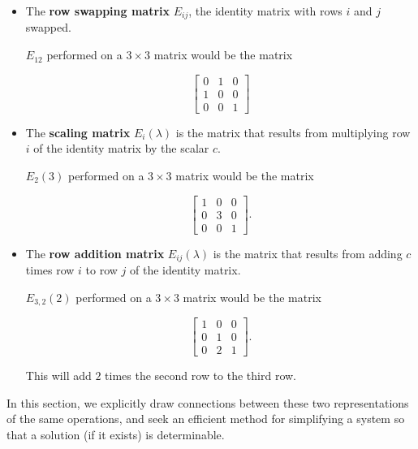\documentclass{ximera}
\begin{document}
\begin{itemize}

  \item The \textbf{row swapping matrix} $E_{ij}$, the identity matrix with rows $i$ and $j$ swapped.
  
  $E_{12}$ performed on a $3\times 3$ matrix would be the matrix

  \begin{equation*}
    \begin{bmatrix}
      0 & 1 & 0 \\
      1 & 0 & 0 \\
      0 & 0 & 1
    \end{bmatrix}
  \end{equation*}

  \item The \textbf{scaling matrix} $E_{i}(\lambda)$ is the matrix that results from multiplying row $i$ of the identity matrix by the scalar $c$.
  
  $E_{2}(3)$ performed on a $3\times 3$ matrix would be the matrix

  \begin{equation*}
    \begin{bmatrix}
      1 & 0 & 0 \\
      0 & 3 & 0 \\
      0 & 0 & 1
    \end{bmatrix}.
  \end{equation*}

  \item The \textbf{row addition matrix} $E_{ij}(\lambda)$ is the matrix that results from adding $c$ times row $i$ to row $j$ of the identity matrix.
  
  $E_{3,2}(2)$ performed on a $3\times 3$ matrix would be the matrix

  \begin{equation*}
    \begin{bmatrix}
      1 & 0 & 0 \\
      0 & 1 & 0 \\
      0 & 2 & 1
    \end{bmatrix}.
  \end{equation*}

  This will add $2$ times the second row to the third row.

\end{itemize}
 
In this section, we explicitly draw connections between these two representations of the same operations, and seek an efficient method for simplifying a system so that a solution (if it exists) is determinable.
 
\end{document}
